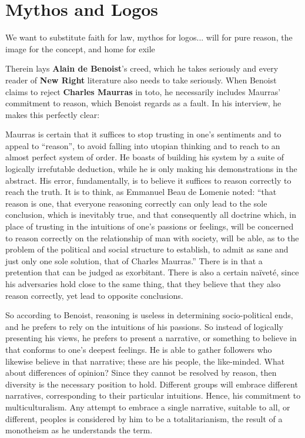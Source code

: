 \section{Mythos and Logos}

\begin{quotex}
We want to substitute faith for law, mythos for logos... will for pure reason, the image for the concept, and home for exile
\end{quotex}


Therein lays \textbf{Alain de Benoist}'s creed, which he takes seriously and every reader of \textbf{New Right} literature also needs to take seriously. When Benoist claims to reject \textbf{Charles Maurras} in toto, he necessarily includes Maurras' commitment to reason, which Benoist regards as a fault. In his interview, he makes this perfectly clear:

\begin{quotex}
Maurras is certain that it suffices to stop trusting in one's sentiments and to appeal to ``reason'', to avoid falling into utopian thinking and to reach to an almost perfect system of order. He boasts of building his system by a suite of logically irrefutable deduction, while he is only making his demonstrations in the abstract. His error, fundamentally, is to believe it suffices to reason correctly to reach the truth. It is to think, as Emmanuel Beau de Lomenie noted: ``that reason is one, that everyone reasoning correctly can only lead to the sole conclusion, which is inevitably true, and that consequently all doctrine which, in place of trusting in the intuitions of one's passions or feelings, will be concerned to reason correctly on the relationship of man with society, will be able, as to the problem of the political and social structure to establish, to admit as sane and just only one sole solution, that of Charles Maurras.'' There is in that a pretention that can be judged as exorbitant. There is also a certain naïveté, since his adversaries hold close to the same thing, that they believe that they also reason correctly, yet lead to opposite conclusions.
\end{quotex}


So according to Benoist, reasoning is useless in determining socio-political ends, and he prefers to rely on the intuitions of his passions. So instead of logically presenting his views, he prefers to present a narrative, or something to believe in that conforms to one's deepest feelings. He is able to gather followers who likewise believe in that narrative; these are his people, the like-minded. What about differences of opinion? Since they cannot be resolved by reason, then diversity is the necessary position to hold. Different groups will embrace different narratives, corresponding to their particular intuitions. Hence, his commitment to multiculturalism. Any attempt to embrace a single narrative, suitable to all, or different, peoples is considered by him to be a totalitarianism, the result of a monotheism as he understands the term.

